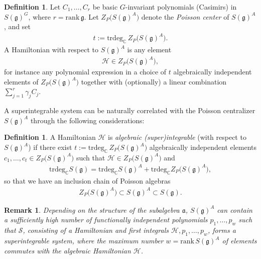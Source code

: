 \documentclass[11pt,reqno]{amsart}
\newtheorem*{theorem A}{Main Theorem A}
\newtheorem*{theorem B}{Main Theorem B}
\newtheorem*{theorem C}{Main Theorem C}
\newtheorem*{theorem D}{Main Theorem D}
\theoremstyle{definition}
\newtheorem{definition}[theorem]{Definition}
\theoremstyle{plain}
\newtheorem{remark}[theorem]{Remark}
\theoremstyle{conclusion}
\begin{document}

\begin{definition}
\label{H}
Let $C_1,\ldots,C_r$ be basic $G$-invariant polynomials (Casimirs) in $S(\mathfrak{g})^G$, where $r=\mathrm{rank}\,\mathfrak{g}$. Let $Z_P\bigl(S(\mathfrak{g})^A\bigr)$ denote the \emph{Poisson center} of $S(\mathfrak{g})^A$, and set \begin{align*}
 t:=\mathrm{trdeg}_{\mathbb{C}}\, Z_P\bigl(S(\mathfrak{g})^A\bigr).
\end{align*} A Hamiltonian with respect to $S(\mathfrak{g})^A$ is any element \begin{align}
\mathcal{H}\in Z_P\bigl(S(\mathfrak{g})^A\bigr), \label{eq:Hamil}
\end{align} for instance any polynomial expression in a choice of $t$ algebraically independent elements of $Z_P\bigl(S(\mathfrak{g})^A\bigr)$ together with (optionally) a linear combination $\sum_{j=1}^r\gamma_j C_j$.
\end{definition}

A superintegrable system can be naturally correlated with the Poisson centralizer $S(\mathfrak{g})^A$ through the following considerations:

\begin{definition}
\label{def:superal}
A Hamiltonian $\mathcal{H}$ is \textit{algebraic (super)integrable} (with respect to $S(\mathfrak{g})^A$) if there exist $t:=\mathrm{trdeg}_{\mathbb{C}}\, Z_P\bigl(S(\mathfrak{g})^A\bigr)$ algebraically independent elements $c_1,\ldots,c_t\in Z_P\bigl(S(\mathfrak{g})^A\bigr)$ such that $\mathcal{H}\in Z_P\bigl(S(\mathfrak{g})^A\bigr)$ and
\begin{align*}
\mathrm{trdeg}_{\mathbb{C}} S(\mathfrak{g})
=
\mathrm{trdeg}_{\mathbb{C}} S(\mathfrak{g})^A
+
\mathrm{trdeg}_{\mathbb{C}} Z_P\bigl(S(\mathfrak{g})^A\bigr),
\end{align*}
so that we have an inclusion chain of Poisson algebras
\begin{align*}
Z_P\bigl(S(\mathfrak{g})^A\bigr)\subset S(\mathfrak{g})^A\subset S(\mathfrak{g}).
\end{align*}
\end{definition}

\begin{remark}
 Depending on the structure of the subalgebra $\mathfrak{a}$, $S(\mathfrak{g})^A$ can contain a sufficiently high number of functionally independent polynomials $p_1,\dots ,p_w$ such that $\mathcal{S}  $, consisting of a Hamiltonian and first integrals $\mathcal{H}, p_1,\dots ,p_w$, forms a superintegrable system, where the maximum number $w = \mathrm{rank}\, S(\mathfrak{g})^A$ of elements commutes with the algebraic Hamiltonian $\mathcal{H}$.
\end{remark}
\end{document}
